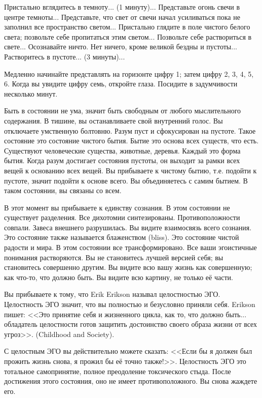 \documentclass[10pt, fleqn]{article}
\begin{document}
Пристально вглядитесь в темноту... (1 минуту)... Представьте огонь свечи в центре темноты... Представьте, что свет от свечи начал усиливаться пока не заполнил все пространство светом... Пристально глядите в поле чистого белого света; позвольте себе пропитаться этим светом... Позвольте себе раствориться в свете... Осознавайте ничто. Нет ничего, кроме великой бездны и пустоты... Растворитесь в пустоте... (3 минуты)...

Медленно начинайте представлять на горизонте цифру 1; затем цифру 2, 3, 4, 5, 6. Когда вы увидите цифру семь, откройте глаза. Посидите в задумчивости несколько минут.

Быть в состоянии не ума, значит быть свободным от любого мыслительного содержания. В тишине, вы останавливаете свой внутренний голос. Вы отключаете умственную болтовню. Разум пуст и сфокусирован на пустоте. Такое состояние это состояние чистого бытия. Бытие это основа всех существ, что есть. Существуют человеческие существа, животные, деревья. Каждый это форма бытия. Когда разум достигает состояния пустоты, он выходит за рамки всех вещей к основанию всех вещей. Вы прибываете к чистому бытию, т.е. подойти к пустоте, значит подойти к основе всего. Вы объединяетесь с самим бытием. В таком состоянии, вы связаны со всем.


В этот момент вы прибываете к единству сознания. В этом состоянии не существует разделения. Все дихотомии синтезированы. Противоположности совпали. Завеса внешнего разрушилась. Вы видите взаимосвязь всего сознания. Это состояние также называется блаженством (bliss). Это состояние чистой радости и мира. В этом состоянии все трансформировано. Все ваши эгоистичные понимания растворяются. Вы не становитесь лучшей версией себя; вы становитесь совершенно другим. Вы видите всю вашу жизнь как совершенную; как что-то, что должно быть. Вы видите всю картину, не только её части.


Вы прибываете к тому, что Erik Erikson называл целостностью ЭГО. Целостность ЭГО значит, что вы полностью и безусловно приняли себя. Erikson пишет: <<Это принятие себя и жизненного цикла, как то, что должно быть... обладатель целостности готов защитить достоинство своего образа жизни от всех угроз>>. (Childhood and Society).

С целостным ЭГО вы действительно можете сказать: <<Если бы я должен был прожить жизнь снова, я прожил бы её точно также!>>. Целостность ЭГО это тотальное самопринятие, полное преодоление токсического стыда. После достижения этого состояния, оно не имеет противоположного. Вы снова жаждете его. 
\end{document}
